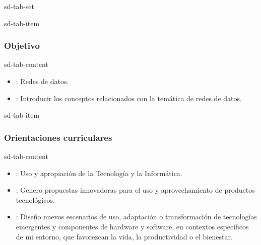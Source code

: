 \documentclass[letterpaper,10pt,spanish]{sphinxmanual}
\begin{document}
\begin{sphinxuseclass}{sd-tab-set}
\begin{sphinxuseclass}{sd-tab-item}\subsubsection*{Objetivo}

\begin{sphinxuseclass}{sd-tab-content}
\sphinxAtStartPar
{}
\begin{itemize}
\item {} 
\sphinxAtStartPar
{}: Redes de datos.

\item {} 
\sphinxAtStartPar
{}: Introducir los conceptos relacionados con la temática de redes de datos.

\end{itemize}

\end{sphinxuseclass}
\end{sphinxuseclass}
\begin{sphinxuseclass}{sd-tab-item}\subsubsection*{Orientaciones curriculares}

\begin{sphinxuseclass}{sd-tab-content}\begin{itemize}
\item {} 
\sphinxAtStartPar
{}: Uso y apropiación de la Tecnología y la Informática.

\item {} 
\sphinxAtStartPar
{}: Genero propuestas innovadoras para el uso y aprovechamiento de productos tecnológicos.

\item {} 
\sphinxAtStartPar
{}: Diseño nuevos escenarios de uso, adaptación o transformación de tecnologías emergentes y componentes de hardware y software, en contextos específicos de mi entorno, que favorezcan la vida, la productividad o el bienestar.


\end{itemize}
\end{sphinxuseclass}
\end{sphinxuseclass}
\end{sphinxuseclass}
\end{document}
